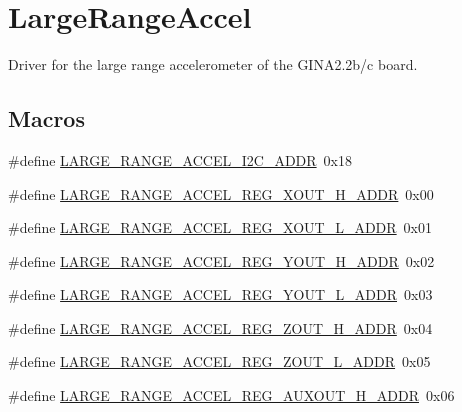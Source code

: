 \hypertarget{group___large_range_accel}{}\section{Large\+Range\+Accel}
\label{group___large_range_accel}


Driver for the large range accelerometer of the G\+I\+N\+A2.\+2b/c board.  


\subsection*{Macros}
\begin{DoxyCompactItemize}
\item 
\#define \hyperlink{group___large_range_accel_ga499806d09c3f3cb347485f2d2fdd8109}{L\+A\+R\+G\+E\+\_\+\+R\+A\+N\+G\+E\+\_\+\+A\+C\+C\+E\+L\+\_\+\+I2\+C\+\_\+\+A\+D\+DR}~0x18
\item 
\#define \hyperlink{group___large_range_accel_gacd1efbafb14d386c92ce50b2d2579c3a}{L\+A\+R\+G\+E\+\_\+\+R\+A\+N\+G\+E\+\_\+\+A\+C\+C\+E\+L\+\_\+\+R\+E\+G\+\_\+\+X\+O\+U\+T\+\_\+\+H\+\_\+\+A\+D\+DR}~0x00
\item 
\#define \hyperlink{group___large_range_accel_gafab7fa16bb9ad7279dbfdfc9d5031ed6}{L\+A\+R\+G\+E\+\_\+\+R\+A\+N\+G\+E\+\_\+\+A\+C\+C\+E\+L\+\_\+\+R\+E\+G\+\_\+\+X\+O\+U\+T\+\_\+\+L\+\_\+\+A\+D\+DR}~0x01
\item 
\#define \hyperlink{group___large_range_accel_gaa77060f6e42c8098fe1effe7b3cd7e1c}{L\+A\+R\+G\+E\+\_\+\+R\+A\+N\+G\+E\+\_\+\+A\+C\+C\+E\+L\+\_\+\+R\+E\+G\+\_\+\+Y\+O\+U\+T\+\_\+\+H\+\_\+\+A\+D\+DR}~0x02
\item 
\#define \hyperlink{group___large_range_accel_gadcd595bc0cf70e4ccbaa95416bb1478d}{L\+A\+R\+G\+E\+\_\+\+R\+A\+N\+G\+E\+\_\+\+A\+C\+C\+E\+L\+\_\+\+R\+E\+G\+\_\+\+Y\+O\+U\+T\+\_\+\+L\+\_\+\+A\+D\+DR}~0x03
\item 
\#define \hyperlink{group___large_range_accel_ga2f703895b5e8bb9c1c198f3d3d729517}{L\+A\+R\+G\+E\+\_\+\+R\+A\+N\+G\+E\+\_\+\+A\+C\+C\+E\+L\+\_\+\+R\+E\+G\+\_\+\+Z\+O\+U\+T\+\_\+\+H\+\_\+\+A\+D\+DR}~0x04
\item 
\#define \hyperlink{group___large_range_accel_ga8f15d6b621ca7e17be0f97debda3dd12}{L\+A\+R\+G\+E\+\_\+\+R\+A\+N\+G\+E\+\_\+\+A\+C\+C\+E\+L\+\_\+\+R\+E\+G\+\_\+\+Z\+O\+U\+T\+\_\+\+L\+\_\+\+A\+D\+DR}~0x05
\item 
\#define \hyperlink{group___large_range_accel_gaf01dc77ef045d9c8c90b94bc34be612b}{L\+A\+R\+G\+E\+\_\+\+R\+A\+N\+G\+E\+\_\+\+A\+C\+C\+E\+L\+\_\+\+R\+E\+G\+\_\+\+A\+U\+X\+O\+U\+T\+\_\+\+H\+\_\+\+A\+D\+DR}~0x06

\end{DoxyCompactItemize}
